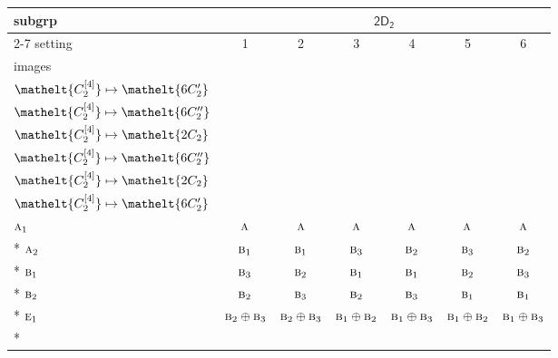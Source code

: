 \documentclass[10pt,a4paper]{article}
\numberwithin{equation}{section}
\newcommand{\eltfont}[1]{{\let\sigma\eltsigma\mathelt{#1}}}
\newcommand{\grp}[1]{\mathsf{#1}}
\newcommand{\irr}[1]{\text{\normalfont\scshape #1}}
\newcommand{\cls}[1]{\eltfont{#1}}
\newcommand{\genidx}[2]{#1^{[\mathrm{#2}]}}
\begin{document}
{\small\begin{longtable}{@{}lcccccc@{}}\toprule
subgrp & \multicolumn{6}{c}{\href{2D2.pdf}{$\grp{2D_{2}}$}}\\\cmidrule(lr){2-7}
setting & 1 & 2 & 3 & 4 & 5 & 6\\
images & {\scriptsize\begin{tabular}[t]{@{}c@{}}$\cls{\genidx{C_{2}}{2}} \mapsto \cls{2C_{2}}$\\$\cls{\genidx{C_{2}}{4}} \mapsto \cls{6C_{2}'}$\end{tabular}} & {\scriptsize\begin{tabular}[t]{@{}c@{}}$\cls{\genidx{C_{2}}{2}} \mapsto \cls{2C_{2}}$\\$\cls{\genidx{C_{2}}{4}} \mapsto \cls{6C_{2}''}$\end{tabular}} & {\scriptsize\begin{tabular}[t]{@{}c@{}}$\cls{\genidx{C_{2}}{2}} \mapsto \cls{6C_{2}'}$\\$\cls{\genidx{C_{2}}{4}} \mapsto \cls{2C_{2}}$\end{tabular}} & {\scriptsize\begin{tabular}[t]{@{}c@{}}$\cls{\genidx{C_{2}}{2}} \mapsto \cls{6C_{2}'}$\\$\cls{\genidx{C_{2}}{4}} \mapsto \cls{6C_{2}''}$\end{tabular}} & {\scriptsize\begin{tabular}[t]{@{}c@{}}$\cls{\genidx{C_{2}}{2}} \mapsto \cls{6C_{2}''}$\\$\cls{\genidx{C_{2}}{4}} \mapsto \cls{2C_{2}}$\end{tabular}} & {\scriptsize\begin{tabular}[t]{@{}c@{}}$\cls{\genidx{C_{2}}{2}} \mapsto \cls{6C_{2}''}$\\$\cls{\genidx{C_{2}}{4}} \mapsto \cls{6C_{2}'}$\end{tabular}}\\\midrule\endhead
\bottomrule\endfoot\endlastfoot
$\irr{a}_{1}$ & $\irr{a}$ & $\irr{a}$ & $\irr{a}$ & $\irr{a}$ & $\irr{a}$ & $\irr{a}$\\*
$\irr{a}_{2}$ & $\irr{b}_{1}$ & $\irr{b}_{1}$ & $\irr{b}_{3}$ & $\irr{b}_{2}$ & $\irr{b}_{3}$ & $\irr{b}_{2}$\\*
$\irr{b}_{1}$ & $\irr{b}_{3}$ & $\irr{b}_{2}$ & $\irr{b}_{1}$ & $\irr{b}_{1}$ & $\irr{b}_{2}$ & $\irr{b}_{3}$\\*
$\irr{b}_{2}$ & $\irr{b}_{2}$ & $\irr{b}_{3}$ & $\irr{b}_{2}$ & $\irr{b}_{3}$ & $\irr{b}_{1}$ & $\irr{b}_{1}$\\*
$\irr{e}_{1}$ & $\irr{b}_{2}\oplus \irr{b}_{3}$ & $\irr{b}_{2}\oplus \irr{b}_{3}$ & $\irr{b}_{1}\oplus \irr{b}_{2}$ & $\irr{b}_{1}\oplus \irr{b}_{3}$ & $\irr{b}_{1}\oplus \irr{b}_{2}$ & $\irr{b}_{1}\oplus \irr{b}_{3}$\\*

\end{longtable}}
\end{document}

